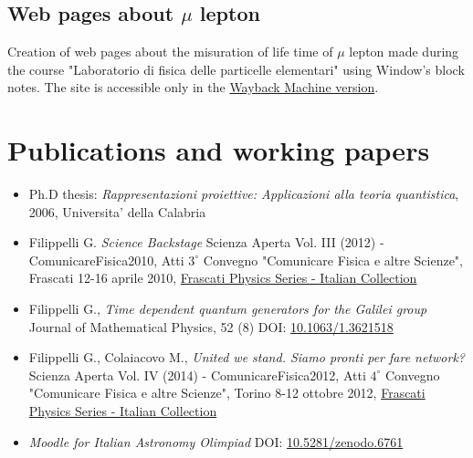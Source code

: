 \documentclass[a4paper]{article}
\begin{document}
\subsection*{Web pages about $\mu$ lepton}
Creation of web pages about the misuration of life time of $\mu$ lepton made during the course "Laboratorio di fisica delle particelle elementari" using Window's block notes. The site is accessible only in the \href{http://web.archive.org/web/20070207064033/http://www.fis.unical.it/gruppi/alteenergie/}{Wayback Machine version}.
%
\newpage
%
\section{Publications and working papers}
\begin{itemize}
	\item Ph.D thesis: {\em Rappresentazioni proiettive: Applicazioni alla teoria quantistica}, 2006, Universita' della Calabria
	\item Filippelli G. {\em Science Backstage} Scienza Aperta Vol. III (2012) - ComunicareFisica2010, Atti $3^\circ$ Convegno "Comunicare Fisica e altre Scienze", Frascati 12-16 aprile 2010, \href{http://www.lnf.infn.it/sis/frascatiseries/italiancollection/index_ita.php}{Frascati Physics Series - Italian Collection}
	\item Filippelli G., {\em Time dependent quantum generators for the Galilei group} Journal of Mathematical Physics, 52 (8) DOI: \href{http://dx.doi.org/10.1063/1.3621518}{10.1063/1.3621518}
	\item Filippelli G., Colaiacovo M., {\em United we stand. Siamo pronti per fare network?} Scienza Aperta Vol. IV (2014) - ComunicareFisica2012, Atti $4^\circ$ Convegno "Comunicare Fisica e altre Scienze", Torino 8-12 ottobre 2012, \href{http://www.lnf.infn.it/sis/frascatiseries/italiancollection/index_ita.php}{Frascati Physics Series - Italian Collection}
	\item {\em Moodle for Italian Astronomy Olimpiad} DOI: \href{http://dx.doi.org/10.5281/zenodo.6761}{10.5281/zenodo.6761}
\end{itemize}
%
\end{document}
